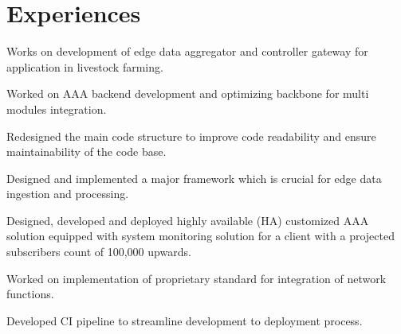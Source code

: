 \documentclass[letterpaper]{deedy-resume} %
\begin{document}
\hfill
%
%
\begin{minipage}[t]{0.66\textwidth} %


\section{Experiences}

\vspace{\topsep}
\begin{tightitemize}
\item Works on development of edge data aggregator and controller gateway for application in livestock farming.
\end{tightitemize}
\sectionspace


\vspace{\topsep} %
\begin{tightitemize}
\item Worked on AAA backend development and optimizing backbone for multi modules integration.
\item Redesigned the main code structure to improve code readability and ensure maintainability of the code base.
\item Designed and implemented a major framework which is crucial for edge data ingestion and processing.
\item Designed, developed and deployed highly available (HA) customized AAA solution equipped with system monitoring solution for a client with a projected subscribers count of 100,000 upwards.
\item Worked on implementation of proprietary standard for integration of network functions.
\item Developed CI pipeline to streamline development to deployment process.
\end{tightitemize}


\end{minipage}
\end{document}
